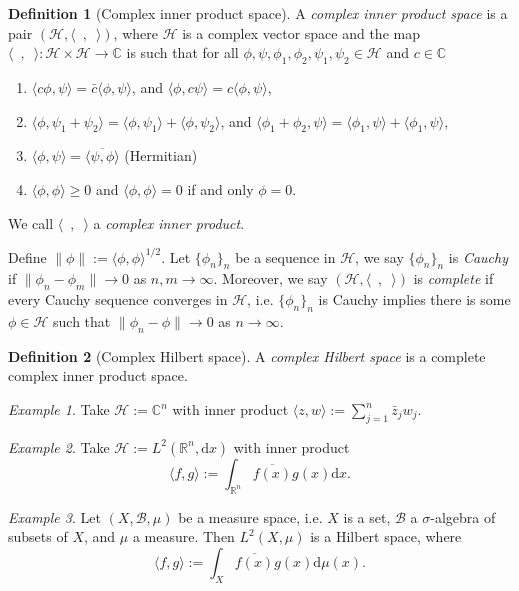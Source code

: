 \documentclass[12pt]{amsart}
\numberwithin{equation}{section}
\theoremstyle{plain}
\theoremstyle{definition}
\newtheorem{defn}{Definition}[subsection]
\theoremstyle{remark}
\newtheorem{ex}{Example}[subsection]
\newcommand{\R}{\mathbb{R}}
\newcommand{\dd}{{\mathrm{d}}}
\newcommand{\calB}{\mathcal{B}}
\newcommand{\calH}{\mathcal{H}}
\begin{document}
\begin{defn}[Complex inner product space]
A \emph{complex inner product space} is a pair $(\calH,\langle\enspace,\enspace\rangle)$, where $\calH$ is a complex vector space and the map $\langle\enspace,\enspace\rangle\colon \calH\times\calH\to \mathbb{C}$ is such that for all $\phi,\psi,\phi_1,\phi_2,\psi_1,\psi_2\in\calH$ and $c\in\mathbb{C}$
\begin{enumerate}
\item{$\langle c\phi,\psi\rangle=\bar c\langle \phi,\psi\rangle$, and $\langle\phi,c\psi\rangle=c\langle \phi,\psi\rangle$,
}
\item{$\langle \phi,\psi_1+\psi_2\rangle=\langle\phi,\psi_1\rangle+\langle\phi,\psi_2\rangle$, and $\langle \phi_1+\phi_2,\psi\rangle=\langle\phi_1,\psi\rangle+\langle\phi_1,\psi\rangle$,
}
\item{$\langle\phi,\psi\rangle=\overline{\langle\psi,\phi\rangle}$ (Hermitian)
}
\item{$\langle\phi,\phi\rangle\geq0$ and $\langle\phi,\phi\rangle=0$ if and only $\phi=0$.
}
\end{enumerate}
We call $\langle\enspace,\enspace\rangle$ a \emph{complex inner product}.
\end{defn}
Define $\|\phi\|:=\langle\phi,\phi\rangle^{1/2}$. Let $\{\phi_n\}_n$ be a sequence in $\calH$, we say $\{\phi_n\}_n$ is \emph{Cauchy} if $\|\phi_n-\phi_m\|\to 0$ as $n,m\to \infty$. Moreover, we say $(\calH,\langle\enspace,\enspace\rangle)$ is \emph{complete} if every Cauchy sequence converges in $\calH$, i.e. $\{\phi_n\}_n$ is Cauchy implies there is some $\phi\in \calH$ such that $\|\phi_n-\phi\|\to 0$ as $n\to\infty$.

\begin{defn}[Complex Hilbert space]
A \emph{complex Hilbert space} is a complete complex inner product space.
\end{defn}


\begin{ex}
Take $\calH:=\mathbb{C}^n$ with inner product $\langle z,w\rangle:=\sum_{j=1}^n\bar z_jw_j$.
\end{ex}

\begin{ex}
Take $\calH:=L^2(\R^n,\dd x)$ with inner product 
\[
\langle f,g\rangle:=\int_{\R^n}\overline{f(x)}g(x)\dd x.
\]
\end{ex}

\begin{ex}
Let $(X,\calB,\mu)$ be a measure space, i.e. $X$ is a set, $\calB$ a $\sigma$-algebra of subsets of $X$, and $\mu$ a measure. Then $L^2(X,\mu)$ is a Hilbert space, where 
\[
\langle f,g\rangle:=\int_X\overline{f(x)}g(x)\dd\mu(x).
\]
\end{ex}
\end{document}
